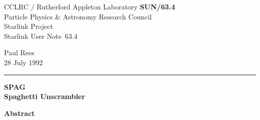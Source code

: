 \documentclass[11pt,twoside]{article}
\newcommand{\stardoccategory}  {Starlink User Note}
\newcommand{\stardocinitials}  {SUN}
\newcommand{\stardocnumber}    {63.4}
\newcommand{\stardocauthors}   {Paul Rees}
\newcommand{\stardocdate}      {28 July 1992}
\newcommand{\stardoctitle}     {SPAG\\[2ex]
                               Spaghetti Unscrambler}
\newcommand{\stardocname}{\stardocinitials /\stardocnumber}
\newenvironment{latexonly}{}{}
\begin{document}
\thispagestyle{empty}

\begin{latexonly}
   CCLRC / {\sc Rutherford Appleton Laboratory} \hfill {\bf \stardocname}\\
   {\large Particle Physics \& Astronomy Research Council}\\
   {\large Starlink Project\\}
   {\large \stardoccategory\ \stardocnumber}
   \begin{flushright}
   \stardocauthors\\
   \stardocdate
   \end{flushright}
   \vspace{-4mm}
   \rule{\textwidth}{0.5mm}
   \vspace{5mm}
   \begin{center}
   {\Huge\bf  \stardoctitle}
   \end{center}
   \vspace{5mm}

   \vspace{10mm}
   \begin{center}
      {\Large\bf Abstract}
   \end{center}
\end{latexonly}
\end{document}
